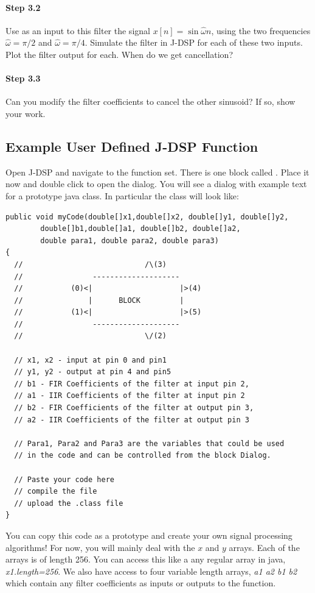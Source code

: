 \paragraph{Step 3.2} Use as an input to this filter the signal $x[n] =
	\sin\hat{\omega}n$, using the two frequencies $\hat{\omega} = \pi/2$
	and $\hat{\omega} = \pi/4$. Simulate the filter in J-DSP for each of
	these two inputs. Plot the filter output for each. When do we get
	cancellation?

\paragraph{Step 3.3} Can you modify the filter coefficients to cancel
	the other sinusoid? If so, show your work.


\subsection{Example User Defined J-DSP Function}\label{sec:example}
Open J-DSP and navigate to the  function set. There
is one block called . Place it now and double
click to open the dialog.  You will see a dialog with example text for
a prototype java class.  In particular the class will look like:
\begin{lstlisting}
public void myCode(double[]x1,double[]x2, double[]y1, double[]y2,
		double[]b1,double[]a1, double[]b2, double[]a2, 
		double para1, double para2, double para3)
{
  //                            /\(3)
  //                --------------------           
  //           (0)<|                    |>(4)
  //               |      BLOCK         |    
  //           (1)<|                    |>(5)
  //                --------------------           
  //                            \/(2)

  // x1, x2 - input at pin 0 and pin1
  // y1, y2 - output at pin 4 and pin5
  // b1 - FIR Coefficients of the filter at input pin 2, 
  // a1 - IIR Coefficients of the filter at input pin 2
  // b2 - FIR Coefficients of the filter at output pin 3, 
  // a2 - IIR Coefficients of the filter at output pin 3

  // Para1, Para2 and Para3 are the variables that could be used 
  // in the code and can be controlled from the block Dialog.

  // Paste your code here
  // compile the file
  // upload the .class file
}
\end{lstlisting}
You can copy this code as a prototype and create your own signal
processing algorithms!  For now, you will mainly deal with the $x$ and
$y$ arrays. Each of the arrays is of length 256.  You can access this
like a any regular array in java, {\it x1.length=256}. We also have
access to four variable length arrays, {\it a1 a2 b1 b2} which contain
any filter coefficients as inputs or outputs to the function.

